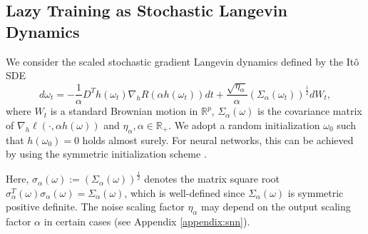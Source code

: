 \documentclass[10pt]{article} %
\newcommand{\R}{\mathbb{R}}
\newcommand{\bR}{\mathbb{R}}
\begin{document}
\subsection{Lazy Training as Stochastic Langevin Dynamics}
We consider the scaled stochastic gradient Langevin dynamics defined by the It\^o SDE
\begin{equation}\label{eq:SDE}
    d\omega_t=-\frac{1}{\alpha}D^Th(\omega_t)\nabla_h R(\alpha h(\omega_t))dt+\frac{\sqrt{\eta_\alpha}}{\alpha}(\Sigma_\alpha(\omega_t))^{\frac{1}{2}}dW_t,
\end{equation}
where $W_t$ is a standard Brownian motion in $\bR^p$, $\Sigma_\alpha(\omega)$ is the covariance matrix of $\nabla_h\ell(\cdot,\alpha h(\omega))$ and $\eta_\alpha,\alpha\in\R_+$. We adopt a random initialization $\omega_0$ such that $h(\omega_0)=0$ holds almost surely. For neural networks, this can be achieved by using the symmetric initialization scheme \citep{bai2020linearizationquadratichigherorderapproximation, ChizatBachlazyTraining, cayci2025convergence}.


Here, $\sigma_\alpha(\omega):=(\Sigma_\alpha(\omega))^\frac{1}{2}$ denotes the matrix square root $\sigma_\alpha^T(\omega) \sigma_\alpha(\omega)=\Sigma_\alpha(\omega)$, which is well-defined since $\Sigma_\alpha(\omega)$ is symmetric positive definite. The noise scaling factor $\eta_\alpha$ may depend on the output scaling factor $\alpha$ in certain cases (see Appendix \ref{appendix:snn}).
\end{document}
